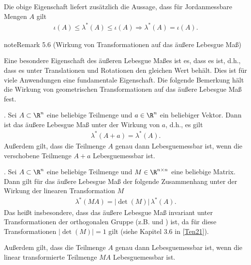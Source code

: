 \documentclass[letterpaper,10pt,german]{jupyterBook}
\begin{document}
\sphinxAtStartPar
Die obige Eigenschaft liefert zusätzlich die Aussage, dass für Jordan\sphinxhyphen{}messbare Mengen \(A\) gilt
\begin{equation*}
\begin{split}\iota(A)\leq\lambda^\ast(A)\leq\iota(A)\Rightarrow \lambda^\ast(A) = \iota(A).\end{split}
\end{equation*}\label{masstheorie/masstheorie:rem:transinvariance}
\begin{sphinxadmonition}{note}{Remark 5.6 (Wirkung von Transformationen auf das äußere Lebesgue Maß)}



\sphinxAtStartPar
Eine besondere Eigenschaft des äußeren Lebesgue Maßes ist es, dass es  ist, d.h., dass es unter Translationen und Rotationen den gleichen Wert behält.
Dies ist für viele Anwendungen eine fundamentale Eigenschaft.
Die folgende Bemerkung hält die Wirkung von geometrischen Transformationen auf das äußere Lebesgue Maß fest.

. Sei \(A \subset \R^n\) eine beliebige Teilmenge und \(a \in \R^n\) ein beliebiger Vektor.
Dann ist das äußere Lebesgue Maß  unter der Wirkung von \(a\), d.h., es gilt
\begin{equation*}
\begin{split}\lambda^*(A + a) = \lambda^*(A).\end{split}
\end{equation*}
\sphinxAtStartPar
Außerdem gilt, dass die Teilmenge \(A\) genau dann Lebesgue\sphinxhyphen{}messbar ist, wenn die verschobene Teilmenge \(A + a\) Lebesgue\sphinxhyphen{}messbar ist.

. Sei \(A \subset \R^n\) eine beliebige Teilmenge und \(M \in \R^{n\times n}\) eine beliebige Matrix.
Dann gilt für das äußere Lebesgue Maß der folgende Zusammenhang unter der Wirkung der linearen Transformation \(M\)
\begin{equation*}
\begin{split}\lambda^*(MA) = |\!\operatorname{det}(M)| \, \lambda^*(A).\end{split}
\end{equation*}
\sphinxAtStartPar
Das heißt insbesondere, dass das äußere Lebesgue Maß invariant unter Transformationen der orthogonalen Gruppe (z.B.  und ) ist, da für diese Transformationen \(|\!\operatorname{det}(M)| = 1\) gilt (siehe Kapitel 3.6 in {[}\hyperlink{cite.references:id15}{Ten21}{]}).

\sphinxAtStartPar
Außerdem gilt, dass die Teilmenge \(A\) genau dann Lebesgue\sphinxhyphen{}messbar ist, wenn die linear transformierte Teilmenge \(MA\) Lebesgue\sphinxhyphen{}messbar ist.
\end{sphinxadmonition}
\end{document}

